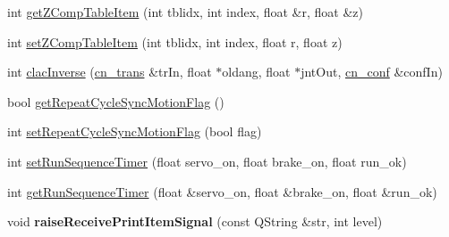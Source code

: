 \begin{DoxyCompactItemize}
\item 
int \hyperlink{classCUIApp_ab5aba87f4504310bacaa9472d86749f6}{get\-Z\-Comp\-Table\-Item} (int tblidx, int index, float \&r, float \&z)
\item 
int \hyperlink{classCUIApp_a421e0358fe93ca66e0f7a74f6c4075b2}{set\-Z\-Comp\-Table\-Item} (int tblidx, int index, float r, float z)
\item 
int \hyperlink{classCUIApp_a8c27562518b7b419056798edfcd2581c}{clac\-Inverse} (\hyperlink{structcn__trans}{cn\-\_\-trans} \&tr\-In, float $\ast$oldang, float $\ast$jnt\-Out, \hyperlink{structcn__conf}{cn\-\_\-conf} \&conf\-In)
\item 
bool \hyperlink{classCUIApp_a5e01da316ce0b59ae5780ef55c1fb9af}{get\-Repeat\-Cycle\-Sync\-Motion\-Flag} ()
\item 
int \hyperlink{classCUIApp_a677a189567521410686a0f302fcb88a2}{set\-Repeat\-Cycle\-Sync\-Motion\-Flag} (bool flag)
\item 
int \hyperlink{classCUIApp_a00d24384842a8f89965038629122628d}{set\-Run\-Sequence\-Timer} (float servo\-\_\-on, float brake\-\_\-on, float run\-\_\-ok)
\item 
int \hyperlink{classCUIApp_a66980bb62ac3fee3ce2eda42cdf632b9}{get\-Run\-Sequence\-Timer} (float \&servo\-\_\-on, float \&brake\-\_\-on, float \&run\-\_\-ok)
\item 
\hypertarget{classCUIApp_aa7d6a48216718947d460c53ef50e20d3}{void {\bfseries raise\-Receive\-Print\-Item\-Signal} (const Q\-String \&str, int level)}\label{classCUIApp_aa7d6a48216718947d460c53ef50e20d3}


\end{DoxyCompactItemize}
